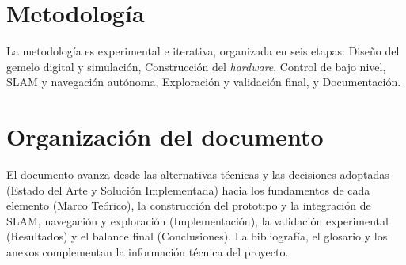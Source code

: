 \section*{Metodología}
{}

La metodología es experimental e iterativa, organizada en seis etapas: Diseño del gemelo digital y simulación, Construcción del \textit{hardware}, Control de bajo nivel, SLAM y navegación autónoma, Exploración y validación final, y Documentación.

\section*{Organización del documento}
{}

El documento avanza desde las alternativas técnicas y las decisiones adoptadas
(Estado del Arte y Solución Implementada) hacia los fundamentos de cada
elemento (Marco Teórico), la construcción del prototipo y la integración de
SLAM, navegación y exploración (Implementación), la validación experimental
(Resultados) y el balance final (Conclusiones). La bibliografía, el glosario y
los anexos complementan la información técnica del proyecto.
